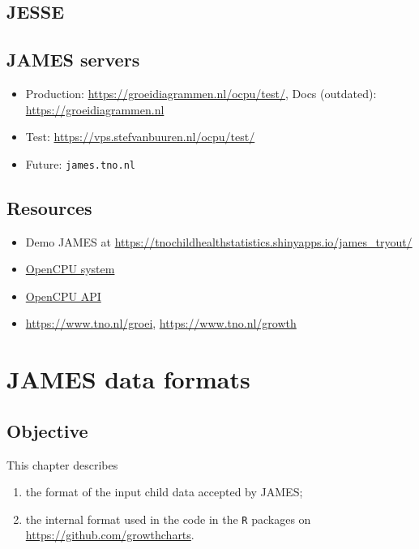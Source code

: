\documentclass[
]{book}
\providecommand{\tightlist}{%
  \setlength{\itemsep}{0pt}\setlength{\parskip}{0pt}}
\begin{document}
\hypertarget{jesse}{%
\section{JESSE}\label{jesse}}

\hypertarget{james-servers}{%
\section{JAMES servers}\label{james-servers}}

\begin{itemize}
\tightlist
\item
  Production: \url{https://groeidiagrammen.nl/ocpu/test/}, Docs (outdated): \url{https://groeidiagrammen.nl}
\item
  Test: \url{https://vps.stefvanbuuren.nl/ocpu/test/}
\item
  Future: \texttt{james.tno.nl}
\end{itemize}

\hypertarget{resources}{%
\section{Resources}\label{resources}}

\begin{itemize}
\tightlist
\item
  Demo JAMES at \url{https://tnochildhealthstatistics.shinyapps.io/james_tryout/}
\item
  \href{https://www.opencpu.org}{OpenCPU system}
\item
  \href{https://www.opencpu.org/api.html}{OpenCPU API}
\item
  \url{https://www.tno.nl/groei}, \url{https://www.tno.nl/growth}
\end{itemize}

\hypertarget{james-data-formats}{%
\chapter{JAMES data formats}\label{james-data-formats}}

\hypertarget{objective}{%
\section{Objective}\label{objective}}

This chapter describes

\begin{enumerate}
\def\labelenumi{\arabic{enumi}.}
\tightlist
\item
  the format of the input child data accepted by JAMES;
\item
  the internal format used in the code in the \texttt{R} packages on \url{https://github.com/growthcharts}.
\end{enumerate}
\end{document}
